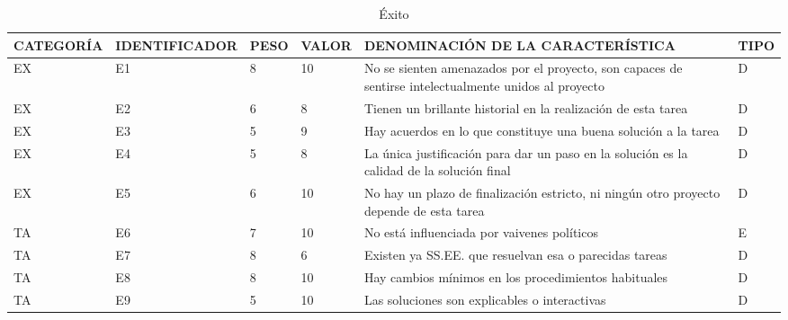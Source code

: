 \documentclass[a4paper,12pt]{article}
\begin{document}
\begin{table}[h]
	\centering
	\begin{tabular}{|l|l|l|l|p{4cm}|l|}
		\hline
		\scriptsize CATEGORÍA & \scriptsize IDENTIFICADOR & \scriptsize PESO & \scriptsize VALOR & \scriptsize DENOMINACIÓN DE LA CARACTERÍSTICA                                                                        & \scriptsize TIPO \\ \hline
		EX                    & E1                        & 8                & 10                & No se sienten amenazados por el proyecto, son capaces de sentirse intelectualmente unidos al proyecto                & D                \\ \hline
		EX                    & E2                        & 6                & 8                 & Tienen un brillante historial en la realización de esta tarea                                                        & D                \\ \hline
		EX                    & E3                        & 5                & 9                 & Hay acuerdos en lo que constituye una buena solución a la tarea                                                      & D                \\ \hline
		EX                    & E4                        & 5                & 8                 & La única justificación para dar un paso en la solución es la calidad de la solución final                            & D                \\ \hline
		EX                    & E5                        & 6                & 10                & No hay un plazo de finalización estricto, ni ningún otro proyecto depende de esta tarea                              & D                \\ \hline
		TA                    & E6                        & 7                & 10                & No está influenciada por vaivenes políticos                                                                          & E                \\ \hline
		TA                    & E7                        & 8                & 6                 & Existen ya SS.EE. que resuelvan esa o parecidas tareas                                                               & D                \\ \hline
		TA                    & E8                        & 8                & 10                & Hay cambios mínimos en los procedimientos habituales                                                                 & D                \\ \hline
		TA                    & E9                        & 5                & 10                & Las soluciones son explicables o interactivas                                                                        & D                \\ \hline
	\end{tabular}
	\caption{Éxito}
	\label{tab:exito1}
\end{table}
\end{document}
